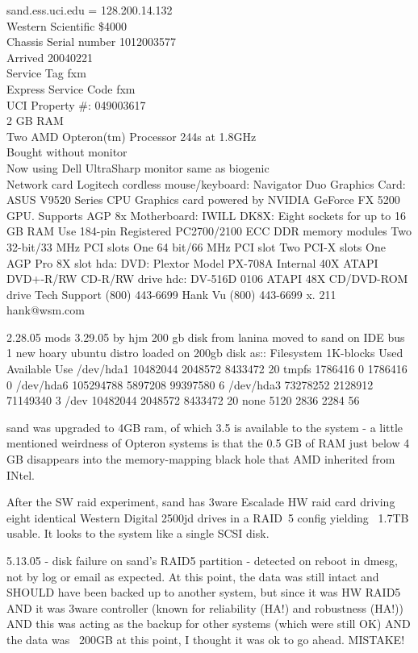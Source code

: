 \documentclass[12pt,twoside]{article}
\begin{document}
sand.ess.uci.edu = 128.200.14.132 \\
Western Scientific \$4000\\
Chassis Serial number 1012003577\\
Arrived 20040221 \\
Service Tag fxm \\
Express Service Code fxm \\
UCI Property \#: 049003617 \\
2 GB RAM\\
Two AMD Opteron(tm) Processor 244s at 1.8GHz\\
Bought without monitor\\
Now using Dell UltraSharp monitor same as biogenic\\
Network card 
Logitech cordless mouse/keyboard: Navigator Duo
Graphics Card: ASUS V9520 Series CPU Graphics card powered by NVIDIA
GeForce FX 5200 GPU. Supports AGP 8x
Motherboard: IWILL DK8X:
Eight sockets for up to 16 GB RAM 
Use 184-pin Registered PC2700/2100 ECC DDR memory modules
Two 32-bit/33 MHz PCI slots
One 64 bit/66 MHz PCI slot
Two PCI-X slots
One AGP Pro 8X slot
hda: DVD: Plextor Model PX-708A Internal 40X ATAPI DVD+-R/RW CD-R/RW drive
hdc: DV-516D 0106 ATAPI 48X CD/DVD-ROM drive
Tech Support (800) 443-6699 
Hank Vu (800) 443-6699 x. 211
hank@wsm.com

2.28.05
mods 3.29.05 by hjm
200 gb disk from lanina moved to sand on IDE bus 1
new hoary ubuntu distro loaded on 200gb disk as::
    Filesystem           1K-blocks      Used Available Use%
    /dev/hda1             10482044   2048572   8433472  20%
    tmpfs                  1786416         0   1786416   0%
    /dev/hda6            105294788   5897208  99397580   6%
    /dev/hda3             73278252   2128912  71149340   3%
    /dev                  10482044   2048572   8433472  20%
    none                      5120      2836      2284  56%

sand was upgraded to 4GB ram, of which 3.5 is available to the system - 
a little mentioned weirdness of Opteron systems is that the 0.5 GB of RAM
just below 4 GB disappears into the memory-mapping black hole that AMD 
inherited from INtel.

After the SW raid experiment, sand has 3ware Escalade HW raid card driving 
eight identical Western Digital 2500jd drives in a RAID~5 config
yielding ~1.7TB usable.   
It looks to the system like a single SCSI disk.

5.13.05 - disk failure on sand's RAID5 partition - detected on reboot in 
dmesg, not by log or email as expected.  At this point, the data was still 
intact and SHOULD have been backed up to another system, but since it was HW 
RAID5 AND it was 3ware controller (known for reliability (HA!) and robustness 
(HA!)) AND this was acting as the backup for other systems (which were still 
OK) AND the data was ~200GB at this point, I thought it was ok to go ahead. 
MISTAKE! 
\end{document}

